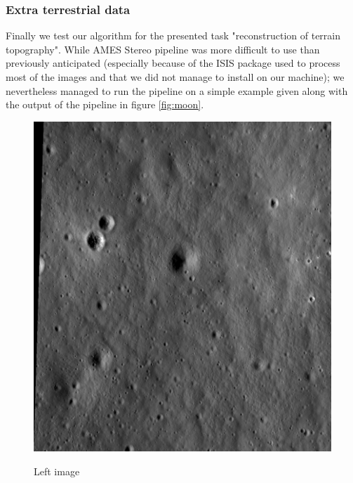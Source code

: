 \documentclass[10pt,twocolumn,letterpaper]{article}
\begin{document}
\subsubsection{Extra terrestrial data}
Finally we test our algorithm for the presented task "reconstruction of terrain topography". While AMES Stereo pipeline was more difficult to use than previously anticipated (especially because of the ISIS package used to process most of the images and that we did not manage to install on our machine); we nevertheless managed to run the pipeline on a simple example given along with the output of the pipeline in figure \ref{fig:moon}. 
\begin{figure}
    \centering
    \begin{minipage}[t]{0.22\textwidth}
    \centerline{\includegraphics[width=\textwidth]{run-L.jpeg}}
    \centerline{Left image}
    \end{minipage}
    \hfill
    \begin{minipage}[t]{0.23\textwidth}   

\end{minipage}
\end{figure}
\end{document}
